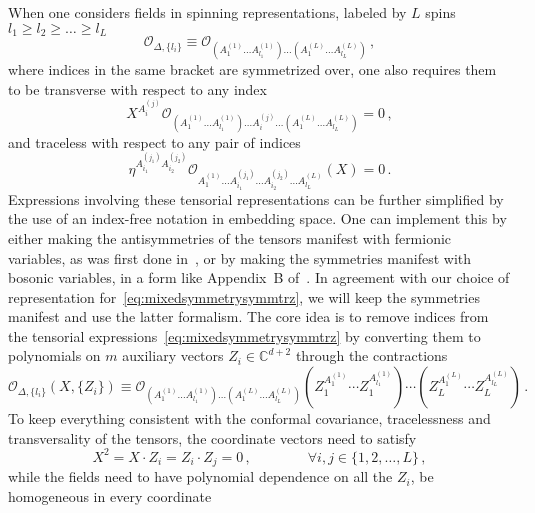 \documentclass{article}
\begin{document}
	When one considers fields in spinning representations, labeled by $L$ spins $l_1\ge l_2\ge \dots \ge l_L$
	\begin{equation}
	    \mathcal{O}_{\Delta,\{l_i\}}\equiv \mathcal{O}_{\left(A^{(1)}_1 \dots A^{(1)}_{l_1}\right)\dots \left(A^{(L)}_1\dots A^{(L)}_{l_L}\right)}\,,
	    \label{eq:mixedsymmetrysymmtrz}
	\end{equation}
	where indices in the same bracket are symmetrized over, one also requires them to be transverse with respect to any index
	\begin{equation}
    X^{A_i^{(j)}}\mathcal{O}_{\left(A^{(1)}_1 \dots A^{(1)}_{l_1}\right)\dots A_i^{(j)}\dots \left(A^{(L)}_1\dots A^{(L)}_{l_L}\right)}=0\,,
\end{equation}
    and traceless with respect to any pair of indices
    \begin{equation}
    \eta^{A^{(j_1)}_{i_1} A^{(j_2)}_{i_2}}\mathcal{O}_{A^{(1)}_1 \dots A^{(j_1)}_{i_1} \dots A^{(j_2)}_{i_2}\dots A^{(L)}_{l_L}}(X)=0\,.
\end{equation}
    Expressions involving these tensorial representations can be further simplified by the use of an index-free notation in embedding space. One can implement this by either making the antisymmetries of the tensors manifest with fermionic variables, as was first done in~\cite{Costa:2014rya}, or by making the symmetries manifest with bosonic variables, in a form like Appendix~B of~\cite{Kologlu:2019mfz}. In agreement with our choice of representation for~\eqref{eq:mixedsymmetrysymmtrz}, we will keep the symmetries manifest and use the latter formalism. The core idea is to remove indices from the tensorial expressions~\eqref{eq:mixedsymmetrysymmtrz} by converting them to polynomials on $m$ auxiliary vectors $Z_i\in \mathbb{C}^{d+2}$ through the contractions
    \begin{equation}
        \mathcal{O}_{\Delta,\{l_i\}}(X,\{Z_i\})\equiv\mathcal{O}_{\left(A^{(1)}_1 \dots A^{(1)}_{l_1}\right)\dots \left(A^{(L)}_1\dots A^{(L)}_{l_L}\right)}\left(Z_1^{A_1^{(1)}}\cdots Z_1^{A_{l_1}^{(1)}}\right)\cdots\left(Z_L^{A_1^{(L)}}\cdots Z_L^{A_{l_L}^{(L)}}\right)\,.
    \end{equation}
	To keep everything consistent with the conformal covariance, tracelessness and transversality of the tensors, the coordinate vectors need to satisfy
	\begin{equation}
	    X^2=X\cdot Z_i=Z_i\cdot Z_j=0\,, \qquad \qquad \forall i,j\in\{1,2,\dots,L\}\,,
	\end{equation}
	while the fields need to have polynomial dependence on all the $Z_i$, be homogeneous in every coordinate
\end{document}
